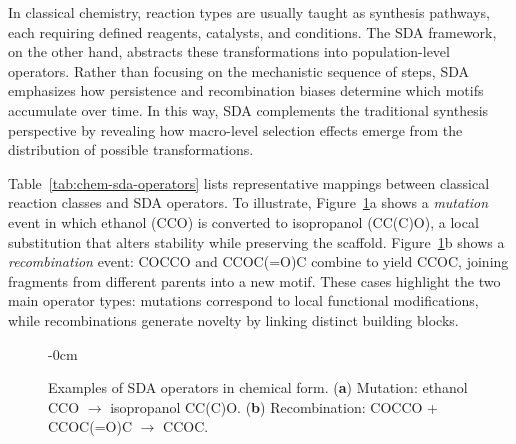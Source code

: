 \documentclass[life,article,submit,pdftex,moreauthors]{Definitions/mdpi}
\begin{document}
In classical chemistry, reaction types are usually taught as synthesis pathways, 
each requiring defined reagents, catalysts, and conditions. The SDA framework, on the other hand, abstracts these transformations into population-level operators. 
Rather than focusing on the mechanistic sequence of steps, SDA emphasizes how
persistence and recombination biases determine which motifs accumulate over time. 
In this way, SDA complements the traditional synthesis perspective by revealing
how macro-level selection effects emerge from the distribution of possible
transformations.  

Table~\ref{tab:chem-sda-operators} lists representative mappings between
classical reaction classes and SDA operators. To illustrate, 
Figure~\ref{fig:mutation-recombination}a shows a \textit{mutation} event in
which ethanol (CCO) is converted to isopropanol (CC(C)O), a local substitution
that alters stability while preserving the scaffold. 
Figure~\ref{fig:mutation-recombination}b shows a \textit{recombination} event: 
COCCO and CCOC(=O)C combine to yield CCOC, joining fragments from different
parents into a new motif. These cases highlight the two main operator types:
mutations correspond to local functional modifications, while recombinations
generate novelty by linking distinct building blocks.



\begin{figure}[H]
\begin{adjustwidth}{-\extralength}{0cm}
\centering
{}
\hspace{0.4cm}
\end{adjustwidth}
\caption{Examples of SDA operators in chemical form. (\textbf{a}) Mutation: ethanol CCO $\to$ isopropanol CC(C)O. 
(\textbf{b}) Recombination: COCCO + CCOC(=O)C $\to$ CCOC.}
\label{fig:mutation-recombination}
\end{figure}
\end{document}
